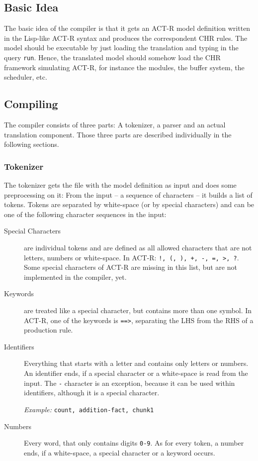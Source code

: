 \subsection{Basic Idea}

The basic idea of the compiler is that it gets an ACT-R model definition written in the Lisp-like ACT-R syntax and produces the correspondent CHR rules. The model should be executable by just loading the translation and typing in the query \lstinline|run|. Hence, the translated model should somehow load the CHR framework simulating ACT-R, for instance the modules, the buffer system, the scheduler, etc. %

\subsection{Compiling}

The compiler consists of three parts: A tokenizer, a parser and an actual translation component. Those three parts are described individually in the following sections.

\subsubsection{Tokenizer}

The tokenizer gets the file with the model definition as input and does some preprocessing on it: From the input -- a sequence of characters -- it builds a list of tokens. Tokens are separated by white-space (or by special characters) and can be one of the following character sequences in the input:

\begin{description}
 \item[Special Characters] are individual tokens and are defined as all allowed characters that are not letters, numbers or white-space. In ACT-R: \lstinline|!, (, ), +, -, =, >, ?|. Some special characters of ACT-R are missing in this list, but are not implemented in the compiler, yet.
 \item[Keywords] are treated like a special character, but contains more than one symbol. In ACT-R, one of the keywords is \lstinline|==>|, separating the LHS from the RHS of a production rule.
 \item[Identifiers] Everything that starts with a letter and contains only letters or numbers. An identifier ends, if a special character or a white-space is read from the input. The \lstinline|-| character is an exception, because it can be used within identifiers, although it is a special character.
 
 \emph{Example:} \lstinline|count, addition-fact, chunk1|
 \item[Numbers] Every word, that only contains digits \lstinline|0-9|. As for every token, a number ends, if a white-space, a special character or a keyword occurs.
\end{description}

